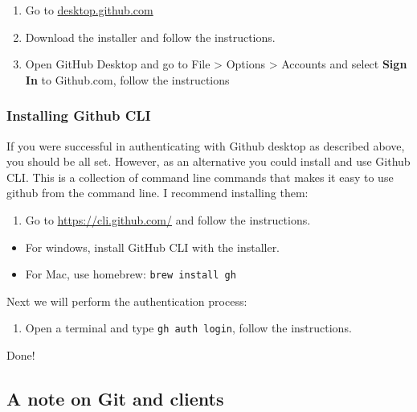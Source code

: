 \documentclass[
  11pt,
  letterpaper,
]{scrbook}
\providecommand{\tightlist}{%
  \setlength{\itemsep}{0pt}\setlength{\parskip}{0pt}}\usepackage{longtable,booktabs,array}
\begin{document}
\begin{enumerate}
\def\labelenumi{\arabic{enumi}.}
\tightlist
\item
  Go to \href{https://desktop.github.com/}{desktop.github.com}
\item
  Download the installer and follow the instructions.
\item
  Open GitHub Desktop and go to File \textgreater{} Options
  \textgreater{} Accounts and select \textbf{Sign In} to Github.com,
  follow the instructions
\end{enumerate}

\hypertarget{installing-github-cli}{%
\subsubsection{Installing Github CLI}\label{installing-github-cli}}

If you were successful in authenticating with Github desktop as
described above, you should be all set. However, as an alternative you
could install and use Github CLI. This is a collection of command line
commands that makes it easy to use github from the command line. I
recommend installing them:

\begin{enumerate}
\def\labelenumi{\arabic{enumi}.}
\tightlist
\item
  Go to \url{https://cli.github.com/} and follow the instructions.
\end{enumerate}

\begin{itemize}
\tightlist
\item
  For windows, install GitHub CLI with the installer.
\item
  For Mac, use homebrew: \texttt{brew\ install\ gh}
\end{itemize}

Next we will perform the authentication process:

\begin{enumerate}
\def\labelenumi{\arabic{enumi}.}
\tightlist
\item
  Open a terminal and type \texttt{gh\ auth\ login}, follow the
  instructions.
\end{enumerate}

Done!

\hypertarget{a-note-on-git-and-clients}{%
\subsection{A note on Git and clients}\label{a-note-on-git-and-clients}}
\end{document}
